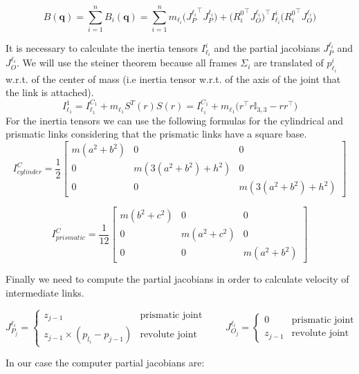\documentclass[a4paper,12pt]{article}
\renewcommand*{\l}{\ell}
\newcommand*{\T}{^\top}
\newcommand*{\I}{\mathbb{I}}
\newcommand*{\q}{\bm{q}}
\begin{document}
\[
B(\q) = \sum_{i=1}^{n} B_i(\q)
      = \sum_{i=1}^{n} m_{\l_i} \bigl({J^{\l_i}_{P}}\T J^{\l_i}_{P}\bigr)
       +  \bigl({R_i^0}\T J^{\l_i}_{O}\bigr)\T I_{\l_i}^{i} \bigl({R_i^0}\T J^{\l_i}_{O}\bigr)
\]

\noindent It is necessary to calculate the inertia tensors $I_{\l_i}^{i}$ and the partial jacobians $J^{\l_i}_{P}$ and $J^{\l_i}_{O}$. We will use the steiner theorem because all frames $\Sigma_i$ are translated of $p_{\l_i}^{i}$ w.r.t. of the center of mass (i.e inertia tensor w.r.t. of the axis of the joint that the
link is attached).
\[
    I_{\l_1}^{1} = I_{\l_1}^{C_1} + m_{\l_1}S^{T}(r)S(r) = I_{\l_1}^{C_1}  +  m_{\l_1}\bigl(r\T r \I_{3,3}  -  r r\T\bigr) 
\]
For the inertia tensors we can use the following formulas for the cylindrical and prismatic links considering that the prismatic links have a square base.
\[
    I^C_{cylinder} = \frac{1}{2}\begin{bmatrix}
        m(a^2+b^2) & 0 &0 \\
        0 &m(3(a^2+b^2)+h^2)& 0 \\
        0& 0& m(3(a^2+b^2)+h^2)
    \end{bmatrix}
\]

\[
    I^C_{prismatic} = \frac{1}{12}\begin{bmatrix}
        m(b^2+c^2) & 0 &0 \\
        0 &m(a^2+c^2)& 0 \\
        0& 0& m(a^2+b^2)
    \end{bmatrix}
\]

\bigskip
\noindent Finally we need to compute the partial jacobians in order to calculate velocity of intermediate links.

\[
    J^{\l_i}_{P_j} = \begin{cases}
       z_{j-1} & \text{prismatic joint} \\
       z_{j-1} \times (p_{l_i}- p_{j-1}) & \text{revolute joint} 
      \end{cases}
    \qquad
    J^{\l_i}_{O_j} = \begin{cases}
    0 & \text{prismatic joint} \\
    z_{j-1} & \text{revolute joint} 
    \end{cases}
\]

\noindent In our case the computer partial jacobians are:
\end{document}
